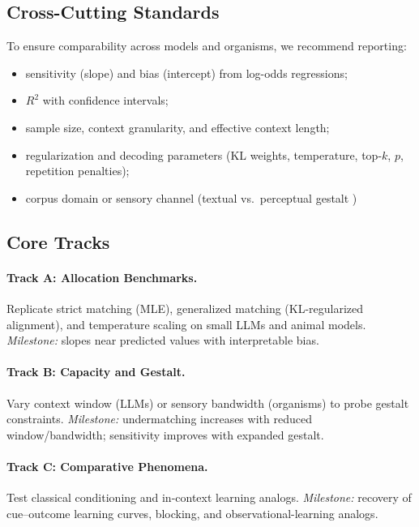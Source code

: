 \documentclass[11pt]{article}
\begin{document}
\subsection*{Cross-Cutting Standards}
To ensure comparability across models and organisms, we recommend reporting:
\begin{itemize}%
  \item sensitivity (slope) and bias (intercept) from log-odds regressions;
  \item $R^2$ with confidence intervals;
  \item sample size, context granularity, and effective context length;
  \item regularization and decoding parameters (KL weights, temperature, top-$k$, $p$, repetition penalties);
  \item corpus domain or sensory channel (textual vs.\ perceptual gestalt \citep{koffka1935principles})
\end{itemize}

\subsection*{Core Tracks}
\paragraph{Track A: Allocation Benchmarks.}
Replicate strict matching (MLE), generalized matching (KL-regularized alignment), and temperature scaling on small LLMs and animal models.  
\emph{Milestone:} slopes near predicted values with interpretable bias.

\paragraph{Track B: Capacity and Gestalt.}
Vary context window (LLMs) or sensory bandwidth (organisms) to probe gestalt constraints.  
\emph{Milestone:} undermatching increases with reduced window/bandwidth; sensitivity improves with expanded gestalt.

\paragraph{Track C: Comparative Phenomena.}
Test classical conditioning \citep{rescorla1972theory} and in-context learning \citep{brown2020language} analogs.  
\emph{Milestone:} recovery of cue–outcome learning curves, blocking, and observational-learning analogs.
\end{document}
